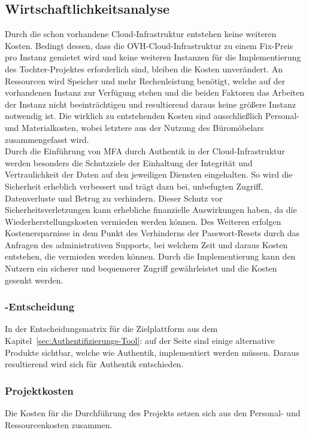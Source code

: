 \subsection{Wirtschaftlichkeitsanalyse}
\label{sec:Wirtschaftlichkeitsanalyse}
Durch die schon vorhandene Cloud-Infrastruktur entstehen keine weiteren Kosten. Bedingt dessen, dass die 
OVH-Cloud-Infrastruktur zu einem Fix-Preis pro Instanz gemietet wird und keine weiteren Instanzen für die Implementierung 
des Tochter-Projektes erforderlich sind, bleiben die Kosten unverändert. An Ressourcen wird Speicher und mehr 
Rechenleistung benötigt, welche auf der vorhandenen Instanz zur Verfügung stehen und die beiden Faktoren das Arbeiten 
der Instanz nicht beeinträchtigen und resultierend daraus keine größere Instanz notwendig ist. Die wirklich zu entstehenden 
Kosten sind ausschließlich Personal- und Materialkosten, wobei letztere aus der Nutzung des Büromöbelars zusammengefasst wird. 
\\Durch die Einführung von \acs{MFA} durch Authentik in der Cloud-Infrastruktur werden besonders die Schutzziele der 
Einhaltung der Integrität und Vertraulichkeit der Daten auf den jeweiligen Diensten eingehalten. So wird die Sicherheit 
erheblich verbessert und trägt dazu bei, unbefugten Zugriff, Datenverluste und Betrug zu verhindern. Dieser Schutz 
vor Sicherheitsverletzungen kann erhebliche finanzielle Auswirkungen haben, da die Wiederherstellungskosten vermieden 
werden können. Des Weiteren erfolgen Kostenersparnisse in dem Punkt des Verhinderns der Passwort-Resets durch das Anfragen des 
administrativen Supports, bei welchem Zeit und daraus Kosten entstehen, die vermieden werden können. Durch die Implementierung 
kann den Nutzern ein sicherer und bequemerer Zugriff gewährleistet und die Kosten gesenkt werden.


\subsubsection{-Entscheidung}
\label{sec:MakeOrBuyEntscheidung}
In der Entscheidungsmatrix für die Zielplattform aus dem Kapitel~\ref{sec:Authentifizierungs-Tool}: 
auf der Seite \pageref{sec:Authentifizierungs-Tool} sind einige alternative Produkte sichtbar, welche wie Authentik, 
implementiert werden müssen. Daraus resultierend wird sich für Authentik entschieden.


\subsubsection{Projektkosten}
\label{sec:Projektkosten}
Die Kosten für die Durchführung des Projekts setzen sich aus den Personal- und Ressourcenkosten zusammen.   

